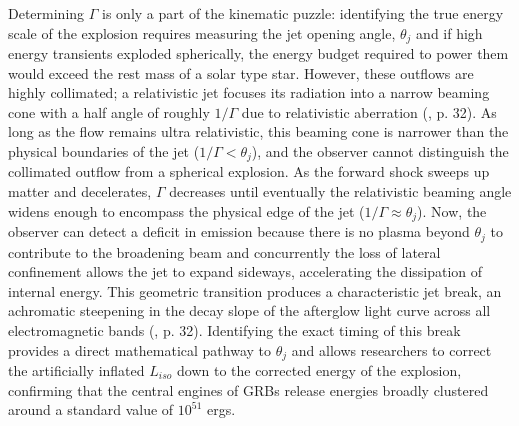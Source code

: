 \documentclass{aa} %
\begin{document}
Determining $\Gamma$ is only a part of the kinematic puzzle: identifying the true energy scale of the explosion requires measuring the jet opening angle, $\theta_j$ and if high energy transients exploded spherically, the energy budget required to power them would exceed the rest mass of a solar type star. However, these outflows are highly collimated; a relativistic jet focuses its radiation into a narrow beaming cone with a half angle of roughly $1/\Gamma$ due to relativistic aberration (\citet{KumarandZhang2015}, p. 32). As long as the flow remains ultra relativistic, this beaming cone is narrower than the physical boundaries of the jet ($1/\Gamma < \theta_j$), and the observer cannot distinguish the collimated outflow from a spherical explosion.
As the forward shock sweeps up matter and decelerates, $\Gamma$ decreases until eventually the relativistic beaming angle widens enough to encompass the physical edge of the jet ($1/\Gamma \approx \theta_j$). Now, the observer can detect a deficit in emission because there is no plasma beyond $\theta_j$ to contribute to the broadening beam and concurrently the loss of lateral confinement allows the jet to expand sideways, accelerating the dissipation of internal energy. This geometric transition produces a characteristic jet break, an achromatic steepening in the decay slope of the afterglow light curve across all electromagnetic bands (\citet{KumarandZhang2015}, p. 32). Identifying the exact timing of this break provides a direct mathematical pathway to $\theta_j$ and allows researchers to correct the artificially inflated $L_{iso}$ down to the corrected energy of the explosion, confirming that the central engines of GRBs release energies broadly clustered around a standard value of $10^{51}$ ergs.
\end{document}
